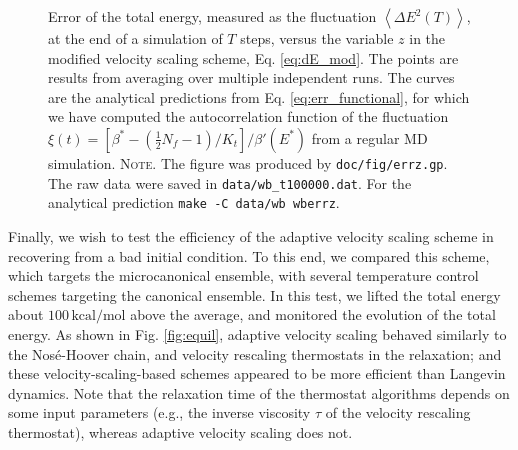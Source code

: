 \documentclass[reprint]{revtex4-1}
\newcommand{\note}[1]{{\color{DarkGreen}\footnotesize \textsc{Note.} #1}}
\begin{document}
\begin{figure}[h]
\begin{center}
  \caption{
    \label{fig:errz}
    Error of the total energy,
    measured as the fluctuation
    $\left\langle \Delta E^2(T) \right\rangle$,
    at the end of a simulation of $T$ steps,
    versus the variable $z$
    in the modified velocity scaling scheme,
    Eq. \eqref{eq:dE_mod}.
    The points are results from averaging over
    multiple independent runs.
    The curves are the analytical predictions from
    Eq. \eqref{eq:err_functional},
    for which we have computed the autocorrelation function
    of the fluctuation
    $\xi(t) = \left[\beta^* - \left(\frac 1 2 N_f-1\right)/K_t\right]/\beta'(E^*)$
    from a regular MD simulation.
    \note{The figure was produced by \texttt{doc/fig/errz.gp}.
      The raw data were saved in \texttt{data/wb\_t100000.dat}.
      For the analytical prediction \texttt{make -C data/wb wberrz}.
    }%
  }
\end{center}
\end{figure}



Finally, we wish to test
the efficiency of the adaptive velocity scaling scheme
in recovering from a bad initial condition.
%
To this end,
we compared this scheme,
which targets the microcanonical ensemble,
with several temperature control schemes
targeting the canonical ensemble.
%
In this test, we lifted the total energy about
$100\,\mathrm{kcal/mol}$ above the average,
and monitored the evolution of the total energy.
%
As shown in Fig. \ref{fig:equil},
adaptive velocity scaling
behaved similarly to
the Nos\'e-Hoover chain\cite{nose1984, nose1984mp, hoover1985, martyna1992},
and velocity rescaling\cite{bussi2007}
thermostats
in the relaxation;
and these velocity-scaling-based schemes
appeared to be more efficient than Langevin dynamics.
%
Note that the relaxation time
of the thermostat algorithms
depends on some input parameters
(e.g., the inverse viscosity $\tau$ of the velocity rescaling thermostat),
whereas adaptive velocity scaling does not.
\end{document}

